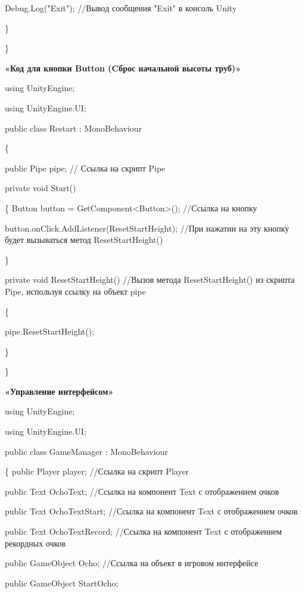 \documentclass[14pt, oneside]{altsu-report}
\begin{document}
        Debug.Log("Exit"); //Вывод сообщения "Exit" в консоль Unity
        
    \}
    
\}


\begin{center}
\label{code:appendix}\textbf{«Код для кнопки Button (Cброс начальной высоты труб)»} 
\end{center} 

using UnityEngine;

using UnityEngine.UI;

public class Restart : MonoBehaviour

\{

    public Pipe pipe; // Ссылка на скрипт Pipe

    private void Start()
    
    \{
        Button button = GetComponent<Button>(); //Ссылка на кнопку
        
        button.onClick.AddListener(ResetStartHeight); //При нажатии на эту кнопку будет вызываться метод ResetStartHeight()
    
    \}

    private void ResetStartHeight() //Вызов метода ResetStartHeight() из скрипта Pipe, используя ссылку на объект pipe
    
    \{
        
        pipe.ResetStartHeight();
    
    \}

\}

\begin{center}
\label{code:appendix}\textbf{«Управление интерфейсом»} 
\end{center} 

using UnityEngine;

using UnityEngine.UI;

public class GameManager : MonoBehaviour

\{
    public Player player; //Ссылка на скрипт Player

    public Text OchoText; //Ссылка на компонент Text с отображением очков

    public Text OchoTextStart; //Ссылка на компонент Text с отображением очков

    public Text OchoTextRecord; //Ссылка на компонент Text с отображением рекордных очков

    public GameObject Ocho; //Ссылка на объект в игровом интерфейсе 

    public GameObject StartOcho;
\end{document}
